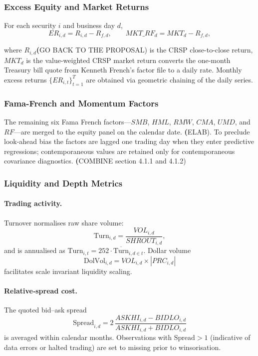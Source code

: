 \subsubsection{Excess Equity and Market Returns}\label{sec:excess_returns}

For each security \(i\) and business day \(d\),
\[
ER_{i,d}=R_{i,d}-R_{f,d},
\qquad
MKT\_RF_{d}=MKT_{d}-R_{f,d},
\]

where \(R_{i,d}\)\textbf(GO BACK TO THE PROPOSAL) is the CRSP close-to-close return, \(MKT_{d}\) is the value-weighted CRSP market return converts the one-month Treasury bill quote from Kenneth French's factor file to a daily rate.  Monthly excess returns \(\{ER_{i,t}\}_{t=1}^{T}\) are obtained via geometric chaining of the daily series.

\subsubsection{Fama-French and Momentum Factors}\label{sec:ff_factors}

The remaining six Fama French factors—\(SMB\), \(HML\), \(RMW\), \(CMA\), \(UMD\), and \(RF\)—are merged to the equity panel on the calendar date.  \textbf(ELAB).  To preclude look-ahead bias the factors are lagged one trading day when they enter predictive regressions; contemporaneous values are retained only for contemporaneous covariance diagnostics. \textbf(COMBINE section 4.1.1 and 4.1.2)

\subsubsection{Liquidity and Depth Metrics}\label{sec:liquidity}

\paragraph{Trading activity.}  Turnover normalises raw share volume:
\[
\text{Turn}_{i,d}=\frac{VOL_{i,d}}{SHROUT_{i,d}},
\]
and is annualised as \(\text{Turn}_{i,t}=252\cdot \overline{\text{Turn}}_{i,d\in t}\).  Dollar volume
\[
\text{DolVol}_{i,d}=VOL_{i,d}\times |PRC_{i,d}|
\]
facilitates scale invariant liquidity scaling.

\paragraph{Relative‐spread cost.}  The quoted bid–ask spread
\[
\text{Spread}_{i,d}=2\,
\frac{ASKHI_{i,d}-BIDLO_{i,d}}
     {ASKHI_{i,d}+BIDLO_{i,d}}
\]
is averaged within calendar months.  Observations with \(\text{Spread}>1\) (indicative of data errors or halted trading) are set to missing prior to winsorisation.

